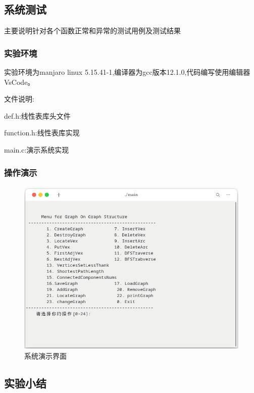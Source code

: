 \documentclass[supercite]{Experimental_Report}
\theoremstyle{definition}
\begin{document}
\subsection{系统测试}

主要说明针对各个函数正常和异常的测试用例及测试结果

\subsubsection{实验环境}

实验环境为manjaro linux 5.15.41-1,编译器为gcc版本12.1.0,代码编写使用编辑器VsCode。

文件说明:

def.h:线性表库头文件

function.h:线性表库实现

main.c:演示系统实现

\subsubsection{操作演示}

\begin{figure}[htb]
	\begin{center}
		\includegraphics[scale=0.60]{images/2-2.png}
		\caption{系统演示界面}
		\label{fig2-2}
	\end{center}
\end{figure}

\subsection{实验小结}
\end{document}
